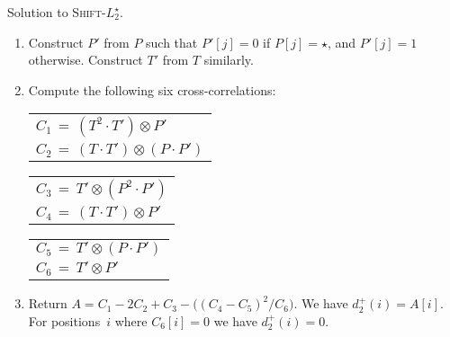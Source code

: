 \documentclass[11pt]{article}
\newcommand{\wildcard}{\ensuremath{\star}\xspace}
\newcommand{\sLtwoWild}{\textsc{Shift-$L_2^\wildcard$}\xspace}
\newcommand{\DsLtwoWild}{\ensuremath{d_2^+}}
\theoremstyle{plain}
\theoremstyle{definition}
\begin{document}
\begin{algorithm}[t]
    \caption{Solution to \sLtwoWild.
    \label{alg:shiftdistance}}
    \begin{enumerate}
        \item Construct $P'$ from $P$ such that $P'[j]=0$ if $P[j]=\wildcard$, and $P'[j]=1$ otherwise. Construct $T'$ from $T$ similarly.
        \item Compute the following six cross-correlations:

        \begin{tabular}{l}
            $C_1 \,=\, (T^2 \cdot T') \otimes P'$ \\
            $C_2 \,=\, (T \cdot T') \otimes (P \cdot P')$
        \end{tabular}
        \hfill
        \begin{tabular}{l}
            $C_3 \,=\, T' \otimes (P^2 \cdot P')$ \\
            $C_4 \,=\, (T \cdot T') \otimes P'$
        \end{tabular}
        \hfill
        \begin{tabular}{l}
            $C_5 \,=\, T' \otimes (P \cdot P')$ \\
            $C_6 \,=\, T'\otimes P'$
        \end{tabular}

        \item Return $A = C_1 - 2 C_2 + C_3 - \big( (C_4 - C_5)^2 / C_6 \big)$. We have $\DsLtwoWild(i)=A[i]$. For positions~$i$ where $C_6[i]=0$ we have $\DsLtwoWild(i)=0$.
    \end{enumerate}
    \vspace{-8pt}
\end{algorithm}
\end{document}
